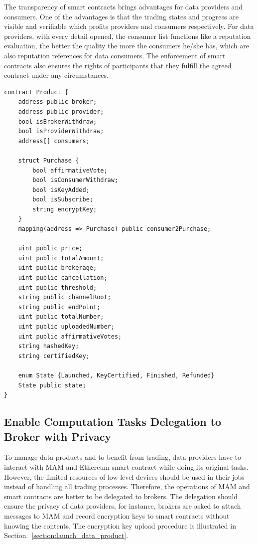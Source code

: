 \begin{spacing}{2.0}
The transparency of smart contracts brings advantages for data providers and consumers. One of the advantages is that the trading states and progress are visible and verifiable which profits providers and consumers respectively. For data providers, with every detail opened, the consumer list functions like a reputation evaluation, the better the quality the more the consumers he/she has, which are also reputation references for data consumers. The enforcement of smart contracts also ensures the rights of participants that they fulfill the agreed contract under any circumstances.

\lstset{style=solidity}
\begin{lstlisting}[caption={Product Contract data fields}, label={lst:constructor}, frame=single]
contract Product {
    address public broker;
    address public provider;
    bool isBrokerWithdraw;
    bool isProviderWithdraw;
    address[] consumers;
    
    struct Purchase {
        bool affirmativeVote;
        bool isConsumerWithdraw;
        bool isKeyAdded;
        bool isSubscribe;
        string encryptKey;
    }
    mapping(address => Purchase) public consumer2Purchase;
    
    uint public price;
    uint public totalAmount;
    uint public brokerage;
    uint public cancellation;
    uint public threshold;
    string public channelRoot;
    string public endPoint;
    uint public totalNumber;
    uint public uploadedNumber;
    uint public affirmativeVotes;
    string hashedKey;
    string certifiedKey;
    
    enum State {Launched, KeyCertified, Finished, Refunded}
    State public state;
}
\end{lstlisting}
\clearpage

\subsection{Enable Computation Tasks Delegation to Broker with Privacy}
To manage data products and to benefit from trading, data providers have to interact with MAM and Ethereum smart contract while doing its original tasks. However, the limited resources of low-level devices should be used in their jobs instead of handling all trading processes. Therefore, the operations of MAM and smart contracts are better to be delegated to brokers. The delegation should ensure the privacy of data providers, for instance, brokers are asked to attach messages to MAM and record encryption keys to smart contracts without knowing the contents. The encryption key upload procedure is illustrated in Section.~\ref{section:launch_data_product}.


\end{spacing}
